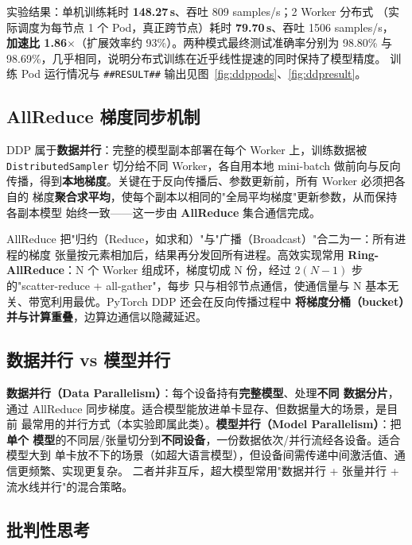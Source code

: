 实验结果：单机训练耗时 \textbf{148.27\,s}、吞吐 809 samples/s；2 Worker 分布式
（实际调度为每节点 1 个 Pod，真正跨节点）耗时 \textbf{79.70\,s}、吞吐 1506 samples/s，
\textbf{加速比 1.86$\times$}（扩展效率约 93\%）。两种模式最终测试准确率分别为
98.80\% 与 98.69\%，几乎相同，说明分布式训练在近乎线性提速的同时保持了模型精度。
训练 Pod 运行情况与 \lstinline!##RESULT##! 输出见图~\ref{fig:ddppods}、\ref{fig:ddpresult}。


\subsection{AllReduce 梯度同步机制}

DDP 属于\textbf{数据并行}：完整的模型副本部署在每个 Worker 上，训练数据被
\lstinline!DistributedSampler! 切分给不同 Worker，各自用本地 mini-batch 做前向与反向
传播，得到\textbf{本地梯度}。关键在于反向传播后、参数更新前，所有 Worker 必须把各自的
梯度\textbf{聚合求平均}，使每个副本以相同的"全局平均梯度"更新参数，从而保持各副本模型
始终一致——这一步由 \textbf{AllReduce} 集合通信完成。

AllReduce 把"归约（Reduce，如求和）"与"广播（Broadcast）"合二为一：所有进程的梯度
张量按元素相加后，结果再分发回所有进程。高效实现常用 \textbf{Ring-AllReduce}：N 个
Worker 组成环，梯度切成 N 份，经过 $2(N-1)$ 步的"scatter-reduce + all-gather"，每步
只与相邻节点通信，使通信量与 N 基本无关、带宽利用最优。PyTorch DDP 还会在反向传播过程中
\textbf{将梯度分桶（bucket）并与计算重叠}，边算边通信以隐藏延迟。

\subsection{数据并行 vs 模型并行}

\textbf{数据并行（Data Parallelism）}：每个设备持有\textbf{完整模型}、处理\textbf{不同
数据分片}，通过 AllReduce 同步梯度。适合模型能放进单卡显存、但数据量大的场景，是目前
最常用的并行方式（本实验即属此类）。\textbf{模型并行（Model Parallelism）}：把\textbf{单个
模型}的不同层/张量切分到\textbf{不同设备}，一份数据依次/并行流经各设备。适合模型大到
单卡放不下的场景（如超大语言模型），但设备间需传递中间激活值、通信更频繁、实现更复杂。
二者并非互斥，超大模型常用"数据并行 + 张量并行 + 流水线并行"的混合策略。

\subsection{批判性思考}

